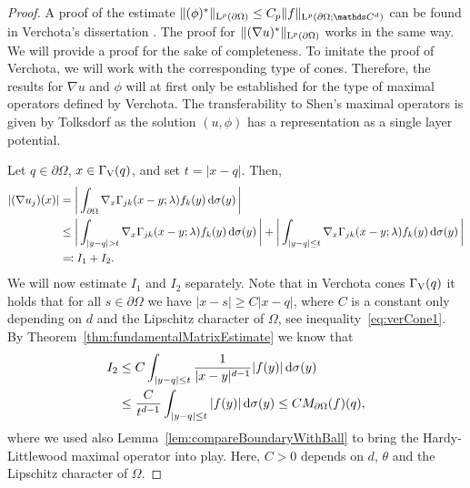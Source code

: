 \begin{proof}
  A proof of the estimate $\|(\phi)^*\|_{\Ell^p(\partial\Omega)} \leq C_p \|f\|_{\Ell^p(\partial\Omega; \C^d)}$ can be found in Verchota's dissertation \cite[Lem.\@~1.3]{verchota}.
  The proof for $\|(\nabla u)^*\|_{\mathrm{L}^p(\partial\Omega)}$ works in the same way. 
  We will provide a proof for the sake of completeness.
  To imitate the proof of Verchota, we will work with the corresponding type of cones.
  Therefore, the results for $\nabla u$ and $\phi$ will at first only be established for the type of maximal operators defined by Verchota.
  The transferability to Shen's maximal operators is given by Tolksdorf \cite[p.\@~90ff.]{tolksdorf} as the solution $(u,\phi)$ has a representation as a single layer potential.

  Let $q \in \partial\Omega$,  $x \in \Gamma_\mathrm{V}(q)$, and set $t = |x - q|$.
  Then,
  \begin{align*}
    |(\nabla u_j)(x) |
    &= \bigg| \int_{\partial\Omega} \nabla_x \Gamma_{jk} (x - y; \lambda) f_k(y) \, {\operatorname{d}\!{\sigma}}(y)\, \bigg| \\
    &\leq \bigg| \int_{|y - q| > t} \nabla_x\Gamma_{jk}(x - y; \lambda) f_k(y) \, {\operatorname{d}\!{\sigma}}(y) \, \bigg| + \bigg| \int_{|y - q| \leq t} \nabla_x \Gamma_{jk}(x - y; \lambda) f_k(y) \, {\operatorname{d}\!{\sigma}}(y)\, \bigg| \\
    &\eqqcolon I_1 + I_2.
  \end{align*}
  We will now estimate $I_1$ and $I_2$ separately.
  Note that in Verchota cones $\Gamma_\mathrm{V}(q)$ it holds that for all $s \in \partial\Omega$ we have $|x - s| \geq C |x - q|$, where $C$ is a constant only depending on $d$ and the Lipschitz character of $\Omega$, see inequality~\eqref{eq:verCone1}.
  By Theorem~\ref{thm:fundamentalMatrixEstimate} we know that
  \begin{align*}
    I_2 
    &\leq C \int_{|y - q| \leq t} \frac{1}{|x - y|^{d - 1}} |f(y)| \, {\operatorname{d}\!{\sigma}}(y) \\
    &\leq \frac{C}{t^{d - 1}} \int_{|y - q| \leq t} |f(y)| \, {\operatorname{d}\!{\sigma}}(y)
    \leq C M_{\partial\Omega} (f)(q),
  \end{align*}
  where we used also Lemma~\ref{lem:compareBoundaryWithBall} to bring the Hardy-Littlewood maximal operator into play.
  Here, $C > 0$ depends on $d$, $\theta$ and the Lipschitz character of $\Omega$.

\end{proof}
